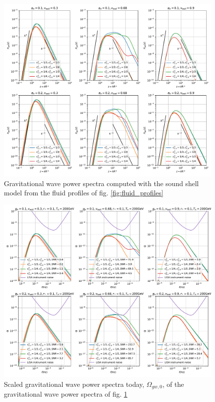 \begin{figure}[ht!]
\centering
\includegraphics[width=\textwidth]{fig/const_cs_gw.pdf}
\caption{Gravitational wave power spectra computed with the sound shell model from the fluid profiles of fig. \ref{fig:fluid_profiles}}
\label{fig:gw_spectra}
\end{figure}

\begin{figure}[ht!]
\centering
\includegraphics[width=\textwidth]{fig/const_cs_gw_omgw0.pdf}
\caption{Scaled gravitational wave power spectra today, $\Omega_{gw,0}$, of the gravitational wave power spectra of fig. \ref{fig:gw_spectra}}
\label{fig:omgw0}
\end{figure}


